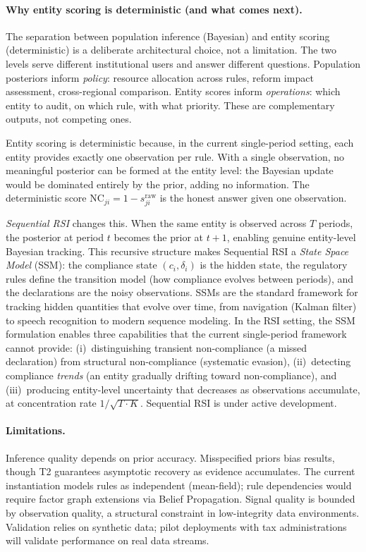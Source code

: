 \documentclass[letterpaper]{article}
\begin{document}
\paragraph{Why entity scoring is deterministic (and what comes next).}
The separation between population inference (Bayesian) and entity
scoring (deterministic) is a deliberate architectural choice, not a
limitation. The two levels serve different institutional users and
answer different questions. Population posteriors inform
\emph{policy}: resource allocation across rules, reform impact
assessment, cross-regional comparison. Entity scores inform
\emph{operations}: which entity to audit, on which rule, with what
priority. These are complementary outputs, not competing ones.

Entity scoring is deterministic because, in the current single-period
setting, each entity provides exactly one observation per rule. With a
single observation, no meaningful posterior can be formed at the entity
level: the Bayesian update would be dominated entirely by the prior,
adding no information. The deterministic score
$\mathrm{NC}_{ji} = 1 - s_{ji}^{\mathrm{raw}}$ is the honest answer
given one observation.

\emph{Sequential RSI} changes this. When the same entity is observed
across $T$ periods, the posterior at period $t$ becomes the prior at
$t{+}1$, enabling genuine entity-level Bayesian tracking. This
recursive structure makes Sequential RSI a \emph{State Space Model}
(SSM): the compliance state $(c_i, \delta_i)$ is the hidden state,
the regulatory rules define the transition model (how compliance
evolves between periods), and the declarations are the noisy
observations. SSMs are the standard framework for tracking hidden
quantities that evolve over time, from navigation (Kalman filter)
to speech recognition to modern sequence modeling. In the RSI
setting, the SSM formulation enables three capabilities that the
current single-period framework cannot provide: (i)~distinguishing
transient non-compliance (a missed declaration) from structural
non-compliance (systematic evasion), (ii)~detecting compliance
\emph{trends} (an entity gradually drifting toward non-compliance),
and (iii)~producing entity-level uncertainty that decreases as
observations accumulate, at concentration rate $1/\sqrt{T \cdot K}$.
Sequential RSI is under active development.

\paragraph{Limitations.}
Inference quality depends on prior accuracy. Misspecified priors bias
results, though T2 guarantees asymptotic recovery as evidence
accumulates. The current instantiation models rules as independent
(mean-field); rule dependencies would require factor graph extensions
via Belief Propagation. Signal quality is bounded by observation
quality, a structural constraint in low-integrity data environments.
Validation relies on synthetic data; pilot deployments with tax
administrations will validate performance on real data streams.
\end{document}
